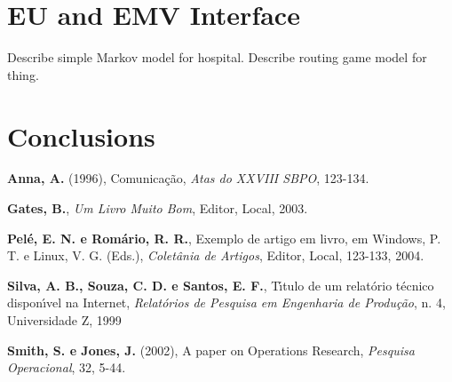 \documentclass[a4paper,11pt]{article}
\begin{document}
\section{EU and EMV Interface}

Describe simple Markov model for hospital.
Describe routing game model for thing.

\section{Conclusions}

\bigskip
{}

\noindent \textbf {Anna, A.} (1996), Comunica\c c\~ao, \textit{Atas do XXVIII SBPO}, 123-134.

\noindent \textbf{Gates, B.}, \textit{Um Livro Muito Bom}, Editor, Local, 2003.

\noindent  \textbf{Pel\'e, E. N. e Rom\'ario, R. R.}, Exemplo de artigo em livro, em Windows, P. T. e Linux, V. G. (Eds.),
\textit{Colet\^ania de Artigos},  Editor, Local, 123-133, 2004.

\noindent  \textbf{Silva, A. B., Souza, C. D. e Santos, E. F.}, T\'\i tulo de um relat\'orio t\'ecnico dispon\'\i vel na Internet,
\textit{ Relat\'orios de Pesquisa em Engenharia de Produ\c c\~ao}, n. 4,  Universidade Z,
1999


\noindent  \textbf{Smith, S. e Jones, J.} (2002), A paper on Operations Research, \textit{Pesquisa Operacional},
32, 5-44.
\end{document}
